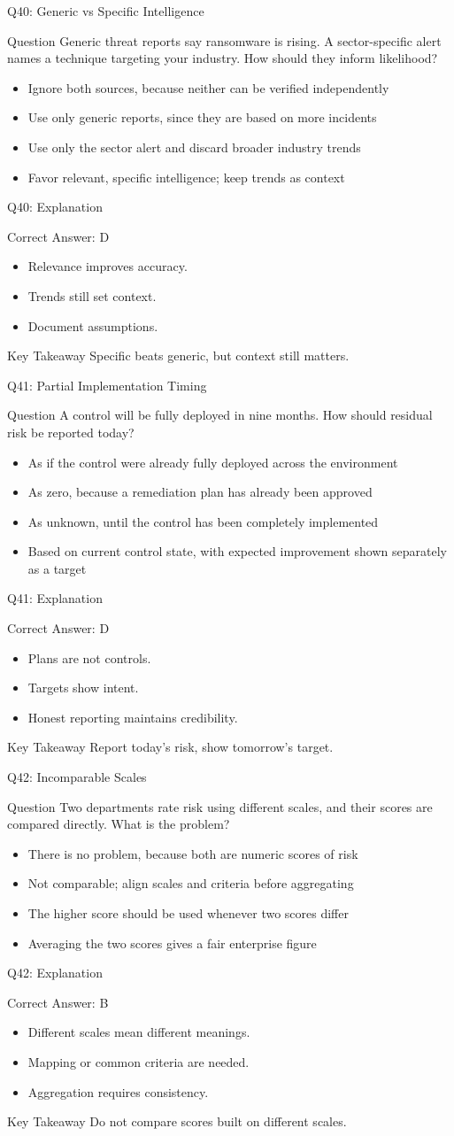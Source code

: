 \documentclass[aspectratio=169]{beamer}
\newcommand{\hq}[7]{%
	\begin{frame}{Q#1: #2}
		\begin{block}{Question}
			#3
		\end{block}
		\begin{itemize}
			#4
		\end{itemize}
	\end{frame}
	\begin{frame}{Q#1: Explanation}
		\begin{block}{Correct Answer: #5}
			\begin{itemize}
				#6
			\end{itemize}
		\end{block}
		\begin{alertblock}{Key Takeaway}
			#7
		\end{alertblock}
	\end{frame}
}
\begin{document}
	\hq{40}{Generic vs Specific Intelligence}
	{Generic threat reports say ransomware is rising. A sector-specific alert names a technique targeting your industry. How should they inform likelihood?}
	{\item[\textbf{(A)}] Ignore both sources, because neither can be verified independently
		\item[\textbf{(B)}] Use only generic reports, since they are based on more incidents
		\item[\textbf{(C)}] Use only the sector alert and discard broader industry trends
		\item[\textbf{(D)}] Favor relevant, specific intelligence; keep trends as context}
	{D}
	{\item Relevance improves accuracy.
		\item Trends still set context.
		\item Document assumptions.}
	{Specific beats generic, but context still matters.}

	\hq{41}{Partial Implementation Timing}
	{A control will be fully deployed in nine months. How should residual risk be reported today?}
	{\item[\textbf{(A)}] As if the control were already fully deployed across the environment
		\item[\textbf{(B)}] As zero, because a remediation plan has already been approved
		\item[\textbf{(C)}] As unknown, until the control has been completely implemented
		\item[\textbf{(D)}] Based on current control state, with expected improvement shown separately as a target}
	{D}
	{\item Plans are not controls.
		\item Targets show intent.
		\item Honest reporting maintains credibility.}
	{Report today's risk, show tomorrow's target.}

	\hq{42}{Incomparable Scales}
	{Two departments rate risk using different scales, and their scores are compared directly. What is the problem?}
	{\item[\textbf{(A)}] There is no problem, because both are numeric scores of risk
		\item[\textbf{(B)}] Not comparable; align scales and criteria before aggregating
		\item[\textbf{(C)}] The higher score should be used whenever two scores differ
		\item[\textbf{(D)}] Averaging the two scores gives a fair enterprise figure}
	{B}
	{\item Different scales mean different meanings.
		\item Mapping or common criteria are needed.
		\item Aggregation requires consistency.}
	{Do not compare scores built on different scales.}
\end{document}
